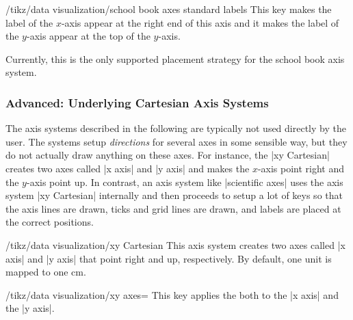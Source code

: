 \begin{key}{/tikz/data visualization/school book axes standard labels}
  This key makes the label of the $x$-axis appear at the right end of
  this axis and it makes the label of the $y$-axis appear at the top
  of the $y$-axis.

  Currently, this is the only supported placement strategy for the
  school book axis system.
\begin{codeexample}[]
\end{codeexample}
\end{key}





\subsubsection{Advanced: Underlying Cartesian Axis Systems}

The axis systems described in the following are typically not used
directly by the user. The systems setup \emph{directions} for several
axes in some sensible way, but they do not actually draw anything on
these axes. For instance, the |xy Cartesian| creates two axes called
|x axis| and |y axis| and makes the $x$-axis point right and the
$y$-axis point up. In contrast, an axis system like |scientific axes|
uses the axis system |xy Cartesian| internally and then proceeds to
setup a lot of keys so that the axis lines are drawn,
ticks and grid lines are drawn, and labels are placed at the correct
positions. 

\begin{key}{/tikz/data visualization/xy Cartesian}
  This axis system creates two axes called |x axis| and |y axis| that
  point right and up, respectively. By default, one unit is mapped to
  one cm.

\begin{codeexample}[]
\end{codeexample}
  
  
  \begin{key}{/tikz/data visualization/xy axes=}
    This key applies the  both to the |x axis| and the
    |y axis|. 
  \end{key}

\end{key}


